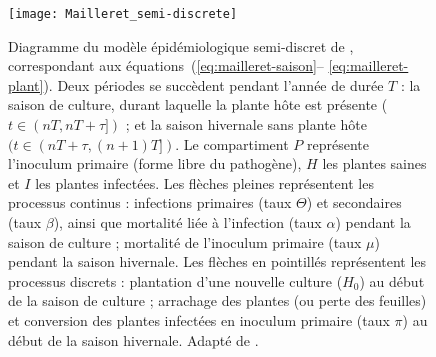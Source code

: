 	\begin{figure}[ht]
	  \centering
	   \texttt{[image: Mailleret\_semi-discrete]}
		\caption[Diagramme du modèle épidémiologique semi-discret de \citet{Mailleret2012}]{Diagramme du modèle  
	    épidémiologique semi-discret de \citet{Mailleret2012}, correspondant aux équations~(\ref{eq:mailleret-saison}--
	    \ref{eq:mailleret-plant}). Deux périodes se succèdent pendant l'année de durée $T$ : 
	    la saison de culture, durant  laquelle la plante hôte est présente ($t \in (nT, nT + \tau])$ ; 
	    et la saison hivernale sans plante hôte $(t \in 
	    (nT + \tau, (n + 1)T])$. Le compartiment $P$ représente l'inoculum primaire (forme libre du pathogène), $H$ les 
	    plantes saines et $I$ les plantes infectées.
	    Les flèches pleines représentent les processus continus : infections primaires (taux $\Theta$) et secondaires 
	    (taux $\beta$), ainsi que mortalité liée à l’infection (taux $\alpha$) pendant la saison de culture ; mortalité 
	    de l'inoculum primaire (taux $\mu$) pendant la saison hivernale. Les flèches en pointillés représentent les 
	    processus discrets : plantation d’une nouvelle culture ($H_0$) au début de la saison de culture ; arrachage des 
	    plantes (ou perte des feuilles) et conversion des plantes infectées en inoculum primaire (taux $\pi$) au début 
	    de la saison hivernale. Adapté de \citet{Mailleret2012}. }
		\label{fig:mailleret}
	\end{figure}
	
